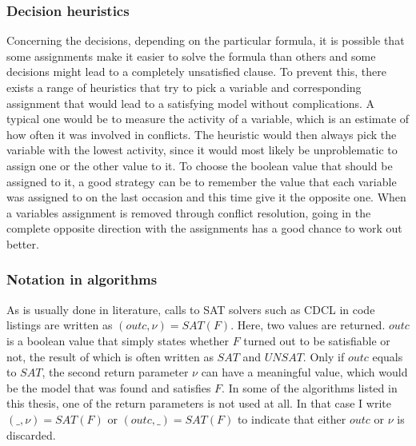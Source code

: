 \subsubsection{Decision heuristics}

Concerning the decisions, depending on the particular formula, it is possible that some assignments make it easier to solve the formula than others and some decisions might lead to a completely unsatisfied clause. To prevent this, there exists a range of heuristics that try to pick a variable and corresponding assignment that would lead to a satisfying model without complications. A typical one would be to measure the activity of a variable, which is an estimate of how often it was involved in conflicts. The heuristic would then always pick the variable with the lowest activity, since it would most likely be unproblematic to assign one or the other value to it. To choose the boolean value that should be assigned to it, a good strategy can be to remember the value that each variable was assigned to on the last occasion and this time give it the opposite one. When a variables assignment is removed through conflict resolution, going in the complete opposite direction with the assignments has a good chance to work out better.


\subsubsection{Notation in algorithms}

As is usually done in literature, calls to SAT solvers such as CDCL in code listings are written as $(outc,\nu) = SAT(F)$. Here, two values are returned. $outc$ is a boolean value that simply states whether $F$ turned out to be satisfiable or not, the result of which is often written as $SAT$ and $UNSAT$. Only if $outc$ equals to $SAT$, the second return parameter $\nu$ can have a meaningful value, which would be the model that was found and satisfies $F$. In some of the algorithms listed in this thesis, one of the return parameters is not used at all. In that case I write $(\_,\nu) = SAT(F)$ or $(outc,\_) = SAT(F)$ to indicate that either $outc$ or $\nu$ is discarded.

